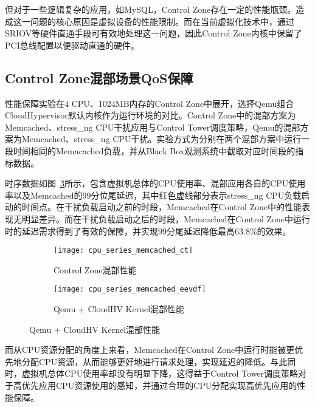 但对于一些逻辑复杂的应用，如MySQL，Control Zone存在一定的性能瓶颈。造成这一问题的核心原因是虚拟设备的性能限制。而在当前虚拟化技术中，通过SRIOV等硬件直通手段可有效地处理这一问题，因此Control Zone内核中保留了PCI总线配置以便驱动直通的硬件。

\subsection{Control Zone混部场景QoS保障}

性能保障实验在4 CPU、1024MB内存的Control Zone中展开，选择Qemu组合CloudHypervisor默认内核作为运行环境的对比。Control Zone中的混部方案为Memcached、stress\_ng CPU干扰应用与Control Tower调度策略，Qemu的混部方案为Memcached、stress\_ng CPU干扰。实验方式为分别在两个混部方案中运行一段时间相同的Memacached负载，并从Black Box观测系统中截取对应时间段的指标数据。

时序数据如图~\ref{fig:cpu_series_memcached}所示，包含虚拟机总体的CPU使用率、混部应用各自的CPU使用率以及Memcached的99分位尾延迟，其中红色虚线部分表示stress\_ng CPU负载启动的时间点。在干扰负载启动之前的时段，Memcached在Control Zone中的性能表现无明显差异。而在干扰负载启动之后的时段，Memcached在Control Zone中运行时的延迟需求得到了有效的保障，并实现99分尾延迟降低最高63.8\%的效果。

\begin{figure}[H]
    \centering
    \begin{subfigure}[b]{0.49\textwidth}
        \texttt{[image: cpu\_series\_memcached\_ct]}
        \caption{\quad Control Zone混部性能}
        \label{fig:cpu_series_memcached_ct}
    \end{subfigure}
    \begin{subfigure}[b]{0.49\textwidth}
        \texttt{[image: cpu\_series\_memcached\_eevdf]}
        \caption{\quad Qemu + CloudHV Kernel混部性能}
        \label{fig:cpu_series_memcached_eevdf}
    \end{subfigure}
    \label{fig:cpu_series_memcached}
\end{figure}

而从CPU资源分配的角度上来看，Memcached在Control Zone中运行时能被更优先地分配CPU资源，从而能够更好地进行请求处理，实现延迟的降低。与此同时，虚拟机总体CPU使用率却没有明显下降，这得益于Control Tower调度策略对于高优先应用CPU资源使用的感知，并通过合理的CPU分配实现高优先应用的性能保障。

